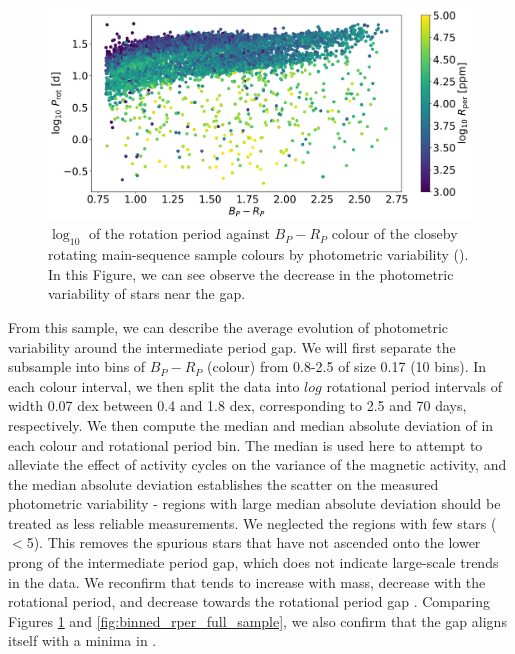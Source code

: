 \begin{figure}
\centering
  \includegraphics[width=\textwidth]{Figures/rot_gap_figures/rotational_dist.png}
  \caption{
  $\log_{10}$ of the rotation period against \gaia $B_P-R_P$ colour of the closeby rotating main-sequence sample colours by photometric variability (\rper{}). 
In this Figure, we can see observe the decrease in the photometric variability of stars near the gap.}
  \label{fig:prawn}
\end{figure}

From this sample, we can describe the average evolution of photometric variability around the intermediate period gap.
We will first separate the subsample into bins of $B_P - R_P$ (colour) from 0.8-2.5 of size 0.17 (10 bins).
In each colour interval, we then split the data into $log$ rotational period intervals of width 0.07 dex between 0.4 and 1.8 dex, corresponding to 2.5 and 70 days, respectively.
We then compute the median and median absolute deviation of \rper{} in each colour and rotational period bin.
The median is used here to attempt to alleviate the effect of activity cycles on the variance of the magnetic activity, and the median absolute deviation establishes the scatter on the measured photometric variability - regions with large median absolute deviation should be treated as less reliable measurements.
We neglected the regions with few stars ($<$5).
This removes the spurious stars that have not ascended onto the lower prong of the intermediate period gap, which does not indicate large-scale trends in the data.
We reconfirm that \rper{} tends to increase with mass, decrease with the rotational period, and decrease towards the rotational period gap \citep{reinhold_stellar_2020, basri_double_2018, santos_surface_2021}.
Comparing Figures \ref{fig:prawn} and \ref{fig:binned_rper_full_sample}, we also confirm that the gap aligns itself with a minima in \rper{}.

